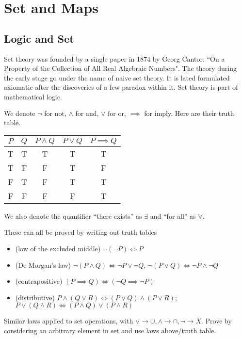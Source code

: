 \documentclass[11pt]{article}
\begin{document}
\maketitle{}
\tableofcontents{}
\pagebreak

\section{Set and Maps}
\subsection{Logic and Set}

Set theory was founded by a single paper in 1874 by Georg Cantor: ``On a Property of the Collection of All Real Algebraic Numbers". The theory during the early stage go under the name of naive set theory. It is lated formulated axiomatic after the discoveries of a few paradox within it. Set theory is part of mathematical logic.

We denote \(\lnot\) for not, \(\land\) for and, \(\lor\) for or, \(\implies\) for imply. Here are their truth table.

\begin{table}[h]
  \begin{tabular}{c|c|c|c|c}
    \(P\) & \(Q\) & \(P\land Q\)& \(P\lor Q\)& \(P\implies Q\) \\
    \hline
    T & T & T & T & T \\
    T & F & F & T & F \\
    F & T & F & T & T \\
    F & F & F & F & T \\
  \end{tabular}
\end{table}

We also denote the quantifier ``there exists'' as \(\exists\) and ``for all'' as \(\forall\).

\begin{proposition}
  These can all be proved by writing out truth tables
  \begin{itemize}
    \item (law of the excluded middle) \(\lnot (\lnot P) \iff P\)
    \item (De Morgan's law) \(\lnot (P \land Q) \iff \lnot P \lor \lnot Q\),  \(\lnot (P \lor Q) \iff \lnot P \land \lnot Q\)
    \item (contrapositive) \((P \implies Q) \iff (\lnot Q \implies \lnot P)\)
    \item (distributive) \(P \land (Q \lor R) \iff (P \lor Q) \land (P \lor R)\);\\ \(P \lor (Q \land R) \iff (P \land Q) \lor (P \land R)\)
  \end{itemize}
\end{proposition}
Similar laws applied to set operations, with \(\lor \to \cup, \land \to \cap, \lnot \to \overline{X}\). Prove by considering an arbitrary element in set and use laws above/truth table.
\end{document}
